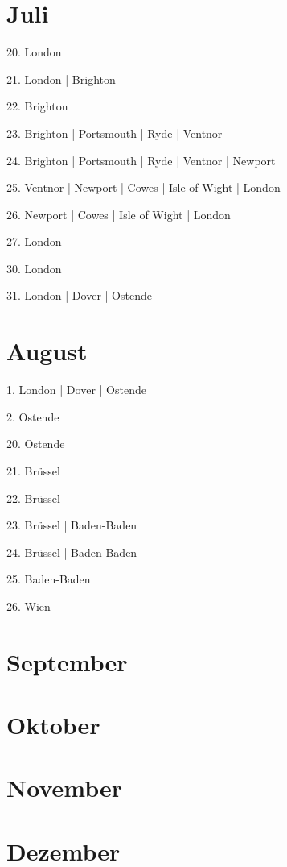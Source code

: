 \documentclass[twoside=false,titlepage=false,open=any, parskip=never, fontsize=10pt, headings=small, chapterprefix=false, appendixprefix=false, DIV=15]{scrbook}
\begin{document}
\begin{multicols}{3}
            \section*{Juli}
            20. London\par
            21. London | Brighton\par
            22. Brighton\par
            23. Brighton | Portsmouth | Ryde | Ventnor\par
            24. Brighton | Portsmouth | Ryde | Ventnor | Newport\par
            25. Ventnor | Newport | Cowes | Isle of Wight | London\par
            26. Newport | Cowes | Isle of Wight | London\par
            27. London\par
            30. London\par
            31. London | Dover | Ostende\par
            \section*{August}
            1. London | Dover | Ostende\par
            2. Ostende\par
            20. Ostende\par
            21. Brüssel\par
            22. Brüssel\par
            23. Brüssel | Baden-Baden\par
            24. Brüssel | Baden-Baden\par
            25. Baden-Baden\par
            26. Wien\par
            \section*{September}
            \section*{Oktober}
            \section*{November}
            \section*{Dezember}

\end{multicols}
\end{document}
